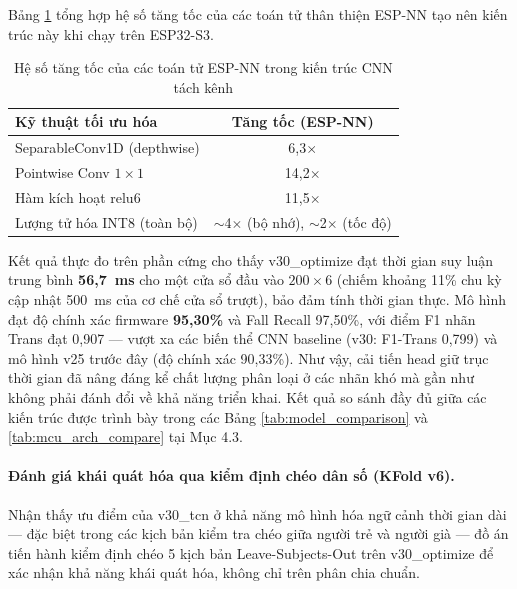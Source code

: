 \documentclass[../DoAn.tex]{subfiles}
\begin{document}
Bảng \ref{tab:espnn_speedup} tổng hợp hệ số tăng tốc của các toán tử thân thiện ESP-NN tạo nên kiến trúc này khi chạy trên ESP32-S3.

\begin{table}[H]
\centering
\caption{Hệ số tăng tốc của các toán tử ESP-NN trong kiến trúc CNN tách kênh}
\label{tab:espnn_speedup}
\begin{tabular}{|l|c|}
\hline
\textbf{Kỹ thuật tối ưu hóa} & \textbf{Tăng tốc (ESP-NN)} \\
\hline
SeparableConv1D (depthwise)     & 6,3$\times$ \\
Pointwise Conv $1 \times 1$     & 14,2$\times$ \\
Hàm kích hoạt relu6             & 11,5$\times$ \\
Lượng tử hóa INT8 (toàn bộ)    & $\sim$4$\times$ (bộ nhớ), $\sim$2$\times$ (tốc độ) \\
\hline
\end{tabular}
\end{table}

Kết quả thực đo trên phần cứng cho thấy v30\_optimize đạt thời gian suy luận trung bình \textbf{56,7~ms} cho một cửa sổ đầu vào $200 \times 6$ (chiếm khoảng 11\% chu kỳ cập nhật 500~ms của cơ chế cửa sổ trượt), bảo đảm tính thời gian thực. Mô hình đạt độ chính xác firmware \textbf{95,30\%} và Fall Recall 97,50\%, với điểm F1 nhãn Trans đạt 0,907 --- vượt xa các biến thể CNN baseline (v30: F1-Trans 0,799) và mô hình v25 trước đây (độ chính xác 90,33\%). Như vậy, cải tiến head giữ trục thời gian đã nâng đáng kể chất lượng phân loại ở các nhãn khó mà gần như không phải đánh đổi về khả năng triển khai. Kết quả so sánh đầy đủ giữa các kiến trúc được trình bày trong các Bảng \ref{tab:model_comparison} và \ref{tab:mcu_arch_compare} tại Mục 4.3.

\paragraph{Đánh giá khái quát hóa qua kiểm định chéo dân số (KFold v6).}

Nhận thấy ưu điểm của v30\_tcn ở khả năng mô hình hóa ngữ cảnh thời gian dài --- đặc biệt trong các kịch bản kiểm tra chéo giữa người trẻ và người già --- đồ án tiến hành kiểm định chéo 5 kịch bản Leave-Subjects-Out trên v30\_optimize để xác nhận khả năng khái quát hóa, không chỉ trên phân chia chuẩn.
\end{document}
